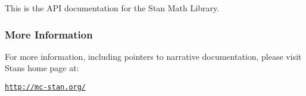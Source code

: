 This is the A\+P\+I documentation for the Stan Math Library.

\subsubsection*{More Information}

 

For more information, including pointers to narrative documentation, please visit Stan\textquotesingle{}s home page at\+: 

\href{http://mc-stan.org/}{\tt http\+://mc-\/stan.\+org/} 